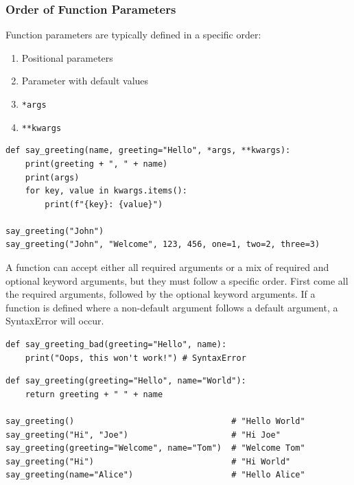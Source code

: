 \newpage
\subsubsection{Order of Function Parameters}
Function parameters are typically defined in a specific order:
\begin{enumerate}
\item Positional parameters
\item Parameter with default values
\item \texttt{*args}
\item \texttt{**kwargs}
\end{enumerate}

\begin{codebox}
\begin{verbatim}
def say_greeting(name, greeting="Hello", *args, **kwargs):
    print(greeting + ", " + name)
    print(args)
    for key, value in kwargs.items():
        print(f"{key}: {value}")

say_greeting("John")
say_greeting("John", "Welcome", 123, 456, one=1, two=2, three=3)
\end{verbatim}
\end{codebox}

A function can accept either all required arguments or a mix of required and optional keyword arguments, but they must follow a specific order. First come all the required arguments, followed by the optional keyword arguments. If a function is defined where a non-default argument follows a default argument, a SyntaxError will occur.

\begin{codebox}
\begin{verbatim}
def say_greeting_bad(greeting="Hello", name):
    print("Oops, this won't work!") # SyntaxError
\end{verbatim}
\end{codebox}

\begin{codebox}
\begin{verbatim}
def say_greeting(greeting="Hello", name="World"):
    return greeting + " " + name

say_greeting()                                # "Hello World"
say_greeting("Hi", "Joe")                     # "Hi Joe"
say_greeting(greeting="Welcome", name="Tom")  # "Welcome Tom"
say_greeting("Hi")                            # "Hi World"
say_greeting(name="Alice")                    # "Hello Alice"
\end{verbatim}
\end{codebox}


